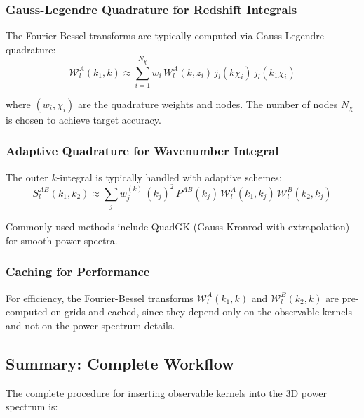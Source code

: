 \subsubsection{Gauss-Legendre Quadrature for Redshift Integrals}

The Fourier-Bessel transforms are typically computed via Gauss-Legendre quadrature:
\begin{equation}
\mathcal{W}_l^A(k_1, k) \approx \sum_{i=1}^{N_\chi} w_i \, W_l^A(k, z_i) \, j_l(k \chi_i) \, j_l(k_1 \chi_i)
\end{equation}

where $(w_i, \chi_i)$ are the quadrature weights and nodes. The number of nodes $N_\chi$ is chosen to achieve target accuracy.

\subsubsection{Adaptive Quadrature for Wavenumber Integral}

The outer $k$-integral is typically handled with adaptive schemes:
\begin{equation}
S_l^{AB}(k_1, k_2) \approx \sum_j w_j^{(k)} \, (k_j)^2 \, P^{AB}(k_j) \, \mathcal{W}_l^A(k_1, k_j) \, \mathcal{W}_l^B(k_2, k_j)
\end{equation}

Commonly used methods include QuadGK (Gauss-Kronrod with extrapolation) for smooth power spectra.

\subsubsection{Caching for Performance}

For efficiency, the Fourier-Bessel transforms $\mathcal{W}_l^A(k_1, k)$ and $\mathcal{W}_l^B(k_2, k)$ are pre-computed on grids and cached, since they depend only on the observable kernels and not on the power spectrum details.

\subsection{Summary: Complete Workflow}

The complete procedure for inserting observable kernels into the 3D power spectrum is:

